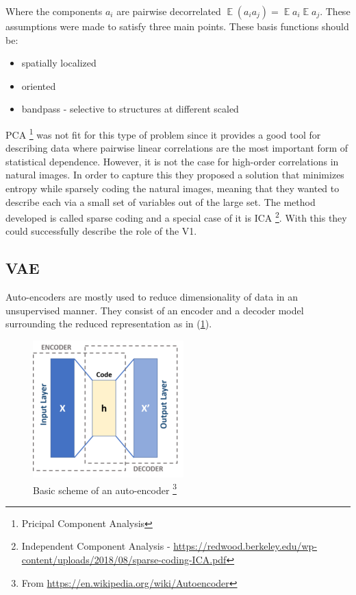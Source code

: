 \documentclass[12pt, english]{article}
\DeclareMathOperator*{\E}{\mathbb{E}}
\begin{document}
\vspace{4mm}

\par Where the components $a_{i}$ are pairwise decorrelated $\E (a_i a_j) = \E a_i \E a_j$. These assumptions were made to satisfy three main points. These basis functions should be:

\vspace{4mm}

\begin{itemize}
    \item spatially localized
    \item oriented
    \item bandpass - selective to structures at different scaled
\end{itemize}

\vspace{4mm}

\par PCA \footnote{Pricipal Component Analysis} was not fit for this type of problem since it provides a good tool for describing data where pairwise linear correlations are the most important form of statistical dependence. However, it is not the case for high-order correlations in natural images. In order to capture this they proposed a solution that minimizes entropy while sparsely coding the natural images, meaning that they wanted to describe each via a small set of variables out of the large set. The method developed is called sparse coding and a special case of it is ICA \footnote{Independent Component Analysis - \url{https://redwood.berkeley.edu/wp-content/uploads/2018/08/sparse-coding-ICA.pdf}}. With this they could successfully describe the role of the V1.

\vspace{5mm}

\subsection{VAE}

\vspace{5mm}

\par Auto-encoders are mostly used to reduce dimensionality of data in an unsupervised manner. They consist of an encoder and a decoder model surrounding the reduced representation as in (\ref{fig:auto_encoder_scheme}). 

\vspace{4mm}

\begin{figure}[H]
    \centering
    \includegraphics[width=0.3\linewidth]{220px-Autoencoder_schema.png}
    \caption{Basic scheme of an auto-encoder \footnote{From \url{https://en.wikipedia.org/wiki/Autoencoder}}}
    \label{fig:auto_encoder_scheme}
\end{figure}
\end{document}
